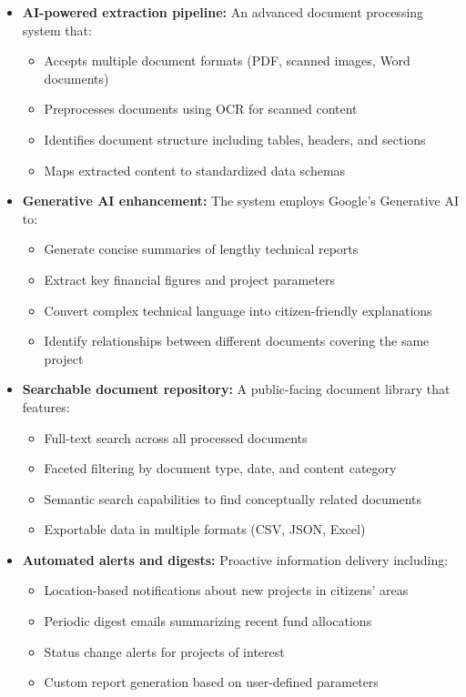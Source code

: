 \documentclass[12pt,a4paper]{report}
\begin{document}
\begin{itemize}
    \item \textbf{AI-powered extraction pipeline:} An advanced document processing system that:
    \begin{itemize}
        \item Accepts multiple document formats (PDF, scanned images, Word documents)
        \item Preprocesses documents using OCR for scanned content
        \item Identifies document structure including tables, headers, and sections
        \item Maps extracted content to standardized data schemas
    \end{itemize}
    
    \item \textbf{Generative AI enhancement:} The system employs Google's Generative AI to:
    \begin{itemize}
        \item Generate concise summaries of lengthy technical reports
        \item Extract key financial figures and project parameters
        \item Convert complex technical language into citizen-friendly explanations
        \item Identify relationships between different documents covering the same project
    \end{itemize}
    
    \item \textbf{Searchable document repository:} A public-facing document library that features:
    \begin{itemize}
        \item Full-text search across all processed documents
        \item Faceted filtering by document type, date, and content category
        \item Semantic search capabilities to find conceptually related documents
        \item Exportable data in multiple formats (CSV, JSON, Excel)
    \end{itemize}
    
    \item \textbf{Automated alerts and digests:} Proactive information delivery including:
    \begin{itemize}
        \item Location-based notifications about new projects in citizens' areas
        \item Periodic digest emails summarizing recent fund allocations
        \item Status change alerts for projects of interest
        \item Custom report generation based on user-defined parameters
    \end{itemize}
\end{itemize}
\end{document}
